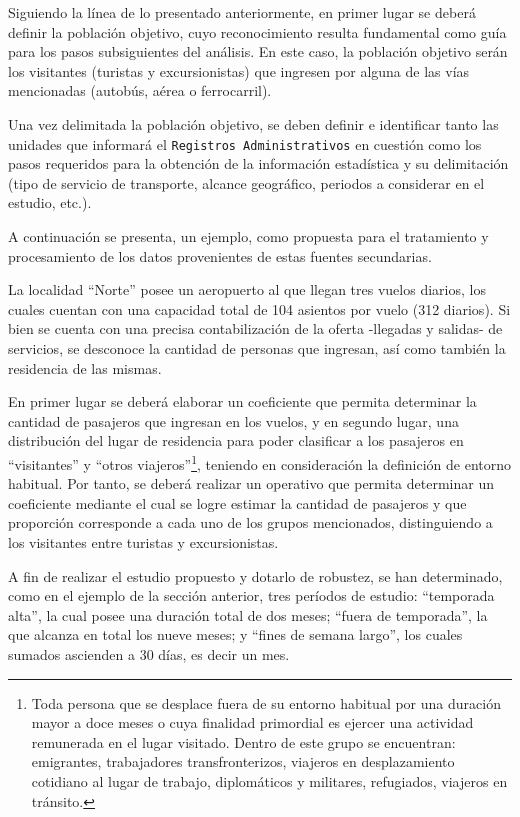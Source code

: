 \documentclass[
]{book}
\begin{document}
Siguiendo la línea de lo presentado anteriormente, en primer lugar se deberá definir la población objetivo, cuyo reconocimiento resulta fundamental como guía para los pasos subsiguientes del análisis. En este caso, la población objetivo serán los visitantes (turistas y excursionistas) que ingresen por alguna de las vías mencionadas (autobús, aérea o ferrocarril).

Una vez delimitada la población objetivo, se deben definir e identificar tanto las unidades que informará el \texttt{Registros\ Administrativos} en cuestión como los pasos requeridos para la obtención de la información estadística y su delimitación (tipo de servicio de transporte, alcance geográfico, periodos a considerar en el estudio, etc.).

A continuación se presenta, un ejemplo, como propuesta para el tratamiento y procesamiento de los datos provenientes de estas fuentes secundarias.

La localidad ``Norte'' posee un aeropuerto al que llegan tres vuelos diarios, los cuales cuentan con una capacidad total de 104 asientos por vuelo (312 diarios). Si bien se cuenta con una precisa contabilización de la oferta -llegadas y salidas- de servicios, se desconoce la cantidad de personas que ingresan, así como también la residencia de las mismas.

En primer lugar se deberá elaborar un coeficiente que permita determinar la cantidad de pasajeros que ingresan en los vuelos, y en segundo lugar, una distribución del lugar de residencia para poder clasificar a los pasajeros en ``visitantes'' y ``otros viajeros''\footnote{Toda persona que se desplace fuera de su entorno habitual por una duración mayor a doce meses o cuya finalidad primordial es ejercer una actividad remunerada en el lugar visitado. Dentro de este grupo se encuentran: emigrantes, trabajadores transfronterizos, viajeros en desplazamiento cotidiano al lugar de trabajo, diplomáticos y militares, refugiados, viajeros en tránsito.}, teniendo en consideración la definición de entorno habitual. Por tanto, se deberá realizar un operativo que permita determinar un coeficiente mediante el cual se logre estimar la cantidad de pasajeros y que proporción corresponde a cada uno de los grupos mencionados, distinguiendo a los visitantes entre turistas y excursionistas.

A fin de realizar el estudio propuesto y dotarlo de robustez, se han determinado, como en el ejemplo de la sección anterior, tres períodos de estudio: ``temporada alta'', la cual posee una duración total de dos meses; ``fuera de temporada'', la que alcanza en total los nueve meses; y ``fines de semana largo'', los cuales sumados ascienden a 30 días, es decir un mes.
\end{document}

